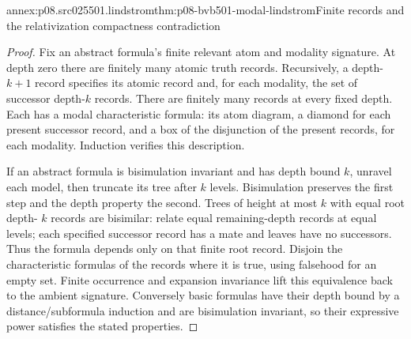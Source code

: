 \begin{annexitem}{annex:p08.src025501.lindstrom}{thm:p08-bvb501-modal-lindstrom}{Finite records and the relativization compactness contradiction}
\begin{proof}
Fix an abstract formula's finite relevant atom and modality signature.
At depth zero there are finitely many atomic truth records. Recursively,
a depth-\(k+1\) record specifies its atomic record and, for each
modality, the set of successor depth-\(k\) records. There are
finitely many records at every fixed depth. Each has a modal
characteristic formula: its atom diagram, a diamond for each present
successor record, and a box of the disjunction of the present records,
for each modality. Induction verifies this description.

If an abstract formula is bisimulation invariant and has depth bound
\(k\), unravel each model, then truncate its tree after \(k\)
levels. Bisimulation preserves the first step and the depth property
the second. Trees of height at most \(k\) with equal root depth-
\(k\) records are bisimilar: relate equal remaining-depth records
at equal levels; each specified successor record has a mate and
leaves have no successors. Thus the formula depends only on that
finite root record. Disjoin the characteristic formulas of the records
where it is true, using falsehood for an empty set. Finite occurrence
and expansion invariance lift this equivalence back to the ambient
signature. Conversely basic formulas have their depth bound by a
distance/subformula induction and are bisimulation invariant, so
their expressive power satisfies the stated properties.


\end{proof}
\end{annexitem}
